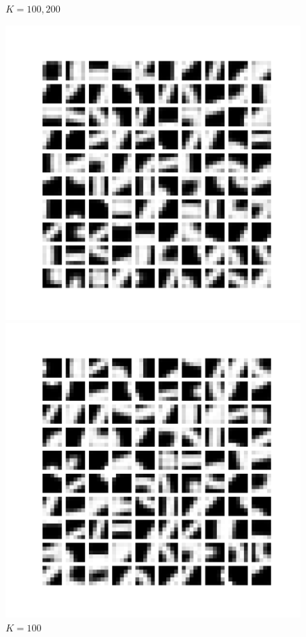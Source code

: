 \documentclass{article}
\begin{document}
\begin{itemize}
\begin{figure}[htbp!]
\item $K = 100, 200$
    \centering
    \begin{minipage}{0.4\textwidth}
        \centering
        \includegraphics[width=\textwidth]{K-means/Result/Centroids/100-clusters-centroids.png}
        \caption{$K = 100$}
        \label{fig:100-centroids}
    \end{minipage}%
    \begin{minipage}{0.4\textwidth}
        \centering
        \includegraphics[width=\textwidth]{K-means/Result/Centroids/200-clusters-centroids.png}

\end{minipage}
\end{figure}
\end{itemize}
\end{document}
